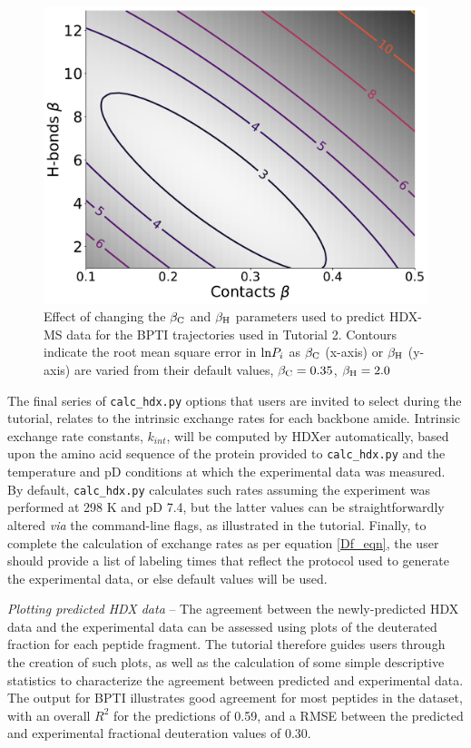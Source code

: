 \documentclass[9pt,tutorial]{livecoms}
\begin{document}
\begin{figure}
    \includegraphics[width=0.98\linewidth]{Fig3_BPTI_noreweight_contour_plot_v2.pdf}
    \caption{Effect of changing the $\beta_\textnormal{C}$ and $\beta_\textnormal{H}$ parameters used to predict HDX-MS data for the BPTI trajectories used in Tutorial 2. Contours indicate the root mean square error in $\textnormal{ln}{P_i}$ as $\beta_\textnormal{C}$ (x-axis) or $\beta_\textnormal{H}$ (y-axis) are varied from their default values, $\beta_\textnormal{C} = 0.35$, $\beta_\textnormal{H} = 2.0$}
    \label{fig:contourplot}
\end{figure}

The final series of \texttt{calc\_hdx.py} options that users are invited to select during the tutorial, relates to the intrinsic exchange rates for each backbone amide.
Intrinsic exchange rate constants, $k_{int}$, will be computed by HDXer automatically, based upon the amino acid sequence of the protein provided to \texttt{calc\_hdx.py} and the temperature and pD conditions at which the experimental data was measured. 
By default, \texttt{calc\_hdx.py} calculates such rates assuming the experiment was performed at 298 K and pD 7.4, but the latter values can be straightforwardly altered \textit{via} the command-line flags, as illustrated in the tutorial.
Finally, to complete the calculation of exchange rates as per equation \ref{Df_eqn}, the user should provide a list of labeling times that reflect the protocol used to generate the experimental data, or else default values will be used.

\noindent
\textit{Plotting predicted HDX data} -- The agreement between the newly-predicted HDX data and the experimental data can be assessed using plots of the deuterated fraction for each peptide fragment.
The tutorial therefore guides users through the creation of such plots, as well as the calculation of some simple descriptive statistics to characterize the agreement between predicted and experimental data. 
The output for BPTI illustrates good agreement for most peptides in the dataset, with an overall $R^2$ for the predictions of 0.59, and a RMSE between the predicted and experimental fractional deuteration values of 0.30. 
\end{document}
